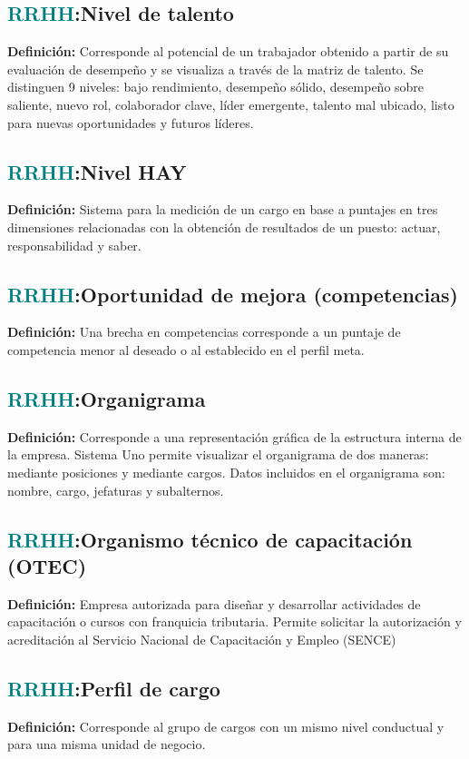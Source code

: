 \documentclass[12pt]{article}
\begin{document}
\subsection{\textcolor{teal}{RRHH}:{Nivel de talento}}
\textbf{Definición:} Corresponde al potencial de un trabajador obtenido a partir de su evaluación de desempeño y se visualiza a través de la matriz de talento. Se distinguen 9 niveles: bajo rendimiento, desempeño sólido, desempeño sobre saliente, nuevo rol, colaborador clave, líder emergente, talento mal ubicado, listo para nuevas oportunidades y futuros líderes.
\subsection{\textcolor{teal}{RRHH}:{Nivel HAY}}
\textbf{Definición:} Sistema para la medición de un cargo en base a puntajes en tres dimensiones relacionadas con la obtención de resultados de un puesto: actuar, responsabilidad y saber.
\subsection{\textcolor{teal}{RRHH}:{Oportunidad de mejora (competencias)}}
\textbf{Definición:} Una brecha en competencias corresponde a un puntaje de competencia menor al deseado o al establecido en el perfil meta.
\subsection{\textcolor{teal}{RRHH}:{Organigrama}}
\textbf{Definición:} Corresponde a una representación gráfica de la estructura interna de la empresa. Sistema Uno permite visualizar el organigrama de dos maneras: mediante posiciones y mediante cargos. Datos incluidos en el organigrama son: nombre, cargo, jefaturas y subalternos.
\subsection{\textcolor{teal}{RRHH}:{Organismo técnico de capacitación (OTEC)}}
\textbf{Definición:} Empresa autorizada para diseñar y desarrollar actividades de capacitación o cursos con franquicia tributaria. Permite solicitar la autorización y acreditación al Servicio Nacional de Capacitación y Empleo (SENCE)
\subsection{\textcolor{teal}{RRHH}:{Perfil de cargo}}
\textbf{Definición:} Corresponde al grupo de cargos con un mismo nivel conductual y para una misma unidad de negocio.
\end{document}
